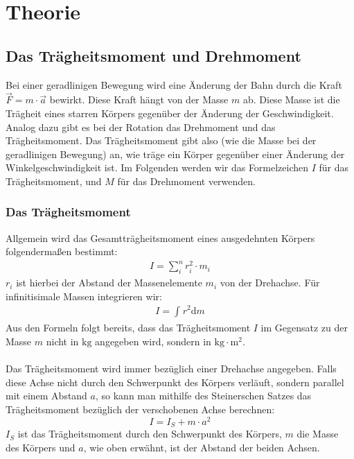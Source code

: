 \section{Theorie}
\label{sec:Theorie}
\subsection{Das Trägheitsmoment und Drehmoment}

Bei einer geradlinigen Bewegung wird eine Änderung der Bahn durch die Kraft $\vec{F} = m \cdot \vec{a}$ bewirkt.
Diese Kraft hängt von der Masse $m$ ab. Diese Masse ist die Trägheit eines starren Körpers gegenüber der Änderung
der Geschwindigkeit. 
\\
Analog dazu gibt es bei der Rotation das Drehmoment und das Trägheitsmoment. Das Trägheitsmoment gibt also (wie die 
Masse bei der geradlinigen Bewegung) an, wie träge ein Körper gegenüber einer Änderung der Winkelgeschwindigkeit ist.
Im Folgenden werden wir das Formelzeichen $I$ für das Trägheitsmoment, und $M$ für das Drehmoment verwenden.
\\

\subsubsection{Das Trägheitsmoment}

Allgemein wird das Gesamtträgheitsmoment eines ausgedehnten Körpers folgendermaßen bestimmt:
\begin{align}
    \label{eqn:Idiskret}
    I = \sum_{i}^{n} r_i^2 \cdot m_i
\end{align}
$r_i$ ist hierbei der Abstand der Massenelemente $m_i$ von der Drehachse.
Für infinitisimale Massen integrieren wir:
\begin{align}
    \label{eqn:I}
    I = \int_{}^{}r^2 \mathrm{d}m
\end{align}
Aus den Formeln folgt bereits, dass das Trägheitsmoment $I$ im Gegensatz zu der Masse $m$ nicht in $\mathrm{kg}$ angegeben wird,
sondern in $\mathrm{kg} \cdot \mathrm{m}^2$.
\\ \\
Das Trägheitsmoment wird immer bezüglich einer Drehachse angegeben. Falls diese Achse nicht durch den Schwerpunkt des Körpers
verläuft, sondern parallel mit einem Abstand $a$, so kann man mithilfe des Steinerschen Satzes das Trägheitsmoment bezüglich
der verschobenen Achse berechnen:
\begin{equation}
    \label{eqn:Steiner}
    I = I_S + m \cdot a^2
\end{equation}
$I_S$ ist das Trägheitsmoment durch den Schwerpunkt des Körpers, $m$ die Masse des Körpers und $a$, wie oben erwähnt, ist der 
Abstand der beiden Achsen.

